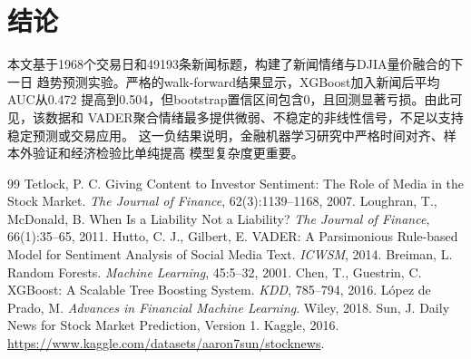 \documentclass[UTF8,a4paper,9.5pt,fontset=none]{ctexart}
\begin{document}
\section{结论}
本文基于1968个交易日和49193条新闻标题，构建了新闻情绪与DJIA量价融合的下一日
趋势预测实验。严格的walk-forward结果显示，XGBoost加入新闻后平均AUC从0.472
提高到0.504，但bootstrap置信区间包含0，且回测显著亏损。由此可见，该数据和
VADER聚合情绪最多提供微弱、不稳定的非线性信号，不足以支持稳定预测或交易应用。
这一负结果说明，金融机器学习研究中严格时间对齐、样本外验证和经济检验比单纯提高
模型复杂度更重要。

\begin{thebibliography}{99}\small
{} Tetlock, P. C. Giving Content to Investor Sentiment: The Role of Media in the Stock Market. \emph{The Journal of Finance}, 62(3):1139--1168, 2007.
 Loughran, T., McDonald, B. When Is a Liability Not a Liability? \emph{The Journal of Finance}, 66(1):35--65, 2011.
 Hutto, C. J., Gilbert, E. VADER: A Parsimonious Rule-based Model for Sentiment Analysis of Social Media Text. \emph{ICWSM}, 2014.
 Breiman, L. Random Forests. \emph{Machine Learning}, 45:5--32, 2001.
 Chen, T., Guestrin, C. XGBoost: A Scalable Tree Boosting System. \emph{KDD}, 785--794, 2016.
 L\'opez de Prado, M. \emph{Advances in Financial Machine Learning}. Wiley, 2018.
 Sun, J. Daily News for Stock Market Prediction, Version 1. Kaggle, 2016. \url{https://www.kaggle.com/datasets/aaron7sun/stocknews}.
\end{thebibliography}
\end{document}
